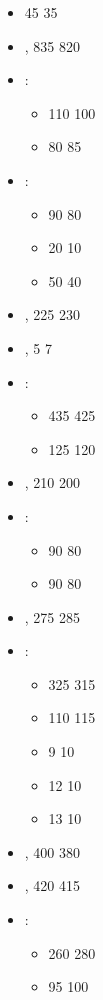 

\subtitle{beta 2.2}

\begin{itemize}
\item \lordofthedamned{} 45 \costup{} 35
\item \exaltedherald{}, \basecost{} 835 \costdown{} 820
\item \chosenlord{}\spacebeforecolon{}:
\begin{itemize}
\item \blacksteed{} 110 \costdown{} 100
\item \karkadan{} 80 \costup{} 85
\end{itemize}
\item \feldrakancestor{}\spacebeforecolon{}:
\begin{itemize}
\item \pw{} 90 \costdown{} 80
\item \gw{} 20 \costdown{} 10
\item \halberd{} 50 \costdown{} 40
\end{itemize}
\item \warriorchariot{}, \basecost{} 225 \costup{} 230
\item \warriorknights{}, \sloth{} 5 \costup{} 7
\item \chosenknights{}\spacebeforecolon{}:
\begin{itemize}
\item \basecost{} 435 \costdown{} 425
\item \extramodel{} 125 \costdown{} 120
\end{itemize}
\item \forsworn{}, \basecost{} 210 \costdown{} 200
\item \wretchedone{}\spacebeforecolon{}:
\begin{itemize}
\item \basecost{} 90 \costdown{} 80
\item \extramodel{} 90 \costdown{} 80
\end{itemize} 
\item \battleshrine{}, \basecost{} 275 \costup{} 285
\item \feldraks{}\spacebeforecolon{}:
\begin{itemize}
\item \basecost{} 325 \costdown{} 315
\item \extramodel{} 110 \costup{} 115
\item \pw{} 9 \costup{} 10
\item \halberd{} 12 \costdown{} 10
\item \gw{} 13 \costdown{} 10
\end{itemize}
\item \forsakenone{}, \basecost{} 400 \costdown{} 380
\item \feldrakelder{}, \basecost{} 420 \costdown{} 415
\item \hellmaw{}\spacebeforecolon{}:
\begin{itemize}
\item \basecost{} 260 \costup{} 280
\item \oneominousgateway{} 95 \costup{} 100
\end{itemize}
\end{itemize}

